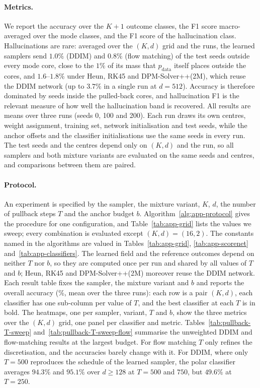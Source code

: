 \paragraph{Metrics.}
We report the accuracy over the $K + 1$ outcome classes, the F1 score macro-averaged over the mode
classes, and the F1 score of the hallucination class. Hallucinations are rare: averaged over the
$(K, d)$ grid and the runs, the learned samplers send $1.0\%$ (DDIM) and $0.8\%$ (flow matching) of
the test seeds outside every mode core, close to the $1\%$ of its mass that $p_{\text{data}}$ itself
places outside the cores, and $1.6$--$1.8\%$ under Heun, RK45 and DPM-Solver++(2M), which reuse the
DDIM network (up to $3.7\%$ in a single run at $d = 512$). Accuracy is therefore dominated by seeds
inside the pulled-back cores, and hallucination F1 is the relevant measure of how well the
hallucination band is recovered. All results are means over three runs (seeds 0, 100 and 200).
Each run draws its own centres, weight assignment, training set, network initialisation and test
seeds, while the anchor offsets and the classifier initialisations use the same seeds in every run.
The test seeds and the centres depend only on $(K, d)$ and the run, so all samplers and both
mixture variants are evaluated on the same seeds and centres, and comparisons between them are
paired.

\paragraph{Protocol.}
An experiment is specified by the sampler, the mixture variant, $K$, $d$, the number of pullback
steps $T$ and the anchor budget $b$. Algorithm~\ref{alg:app-protocol} gives the procedure for one
configuration, and Table~\ref{tab:app-grid} lists the values we sweep; every combination is
evaluated except $(K, d) = (16, 2)$. The constants named in the algorithms are valued in
Tables~\ref{tab:app-grid}, \ref{tab:app-scorenet} and~\ref{tab:app-classifiers}. The learned field
and the reference outcomes depend on neither $T$ nor $b$, so they are computed once per run and
shared by all values of $T$ and $b$; Heun, RK45 and DPM-Solver++(2M) moreover reuse the DDIM
network. Each result table fixes the sampler, the mixture variant and $b$ and reports the overall
accuracy (\%, mean over the three runs): each row is a pair $(K, d)$, each classifier has one
sub-column per value of $T$, and the best classifier at each $T$ is in bold. The heatmaps, one per
sampler, variant, $T$ and $b$, show the three metrics over the $(K, d)$ grid, one panel per
classifier and metric. Tables~\ref{tab:pullback-T-sweep} and~\ref{tab:pullback-T-sweep-flow}
summarise the unweighted DDIM and flow-matching results at the largest budget. For flow matching
$T$ only refines the discretisation, and the accuracies barely change with it. For DDIM, where only
$T = 500$ reproduces the schedule of the learned sampler, the polar classifier averages $94.3\%$ and
$95.1\%$ over $d \ge 128$ at $T = 500$ and $750$, but $49.6\%$ at $T = 250$.

